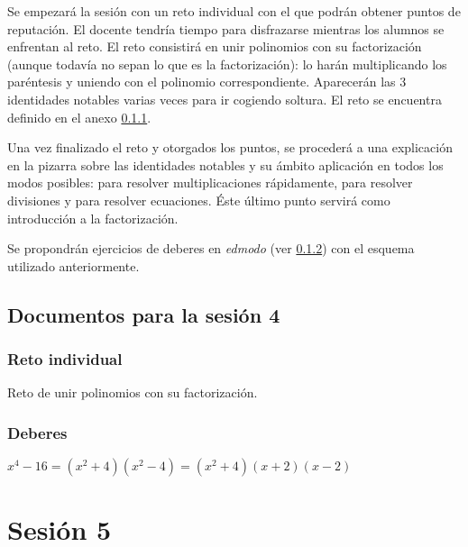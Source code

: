 Se empezará la sesión con un reto individual con el que podrán obtener puntos de reputación.
%
El docente tendría tiempo para disfrazarse mientras los alumnos se enfrentan al reto.
%
El reto consistirá en unir polinomios con su factorización (aunque todavía no sepan lo que es la factorización): lo harán multiplicando los paréntesis y uniendo con el polinomio correspondiente.
%
Aparecerán las 3 identidades notables varias veces para ir cogiendo soltura.
%
El reto se encuentra definido en el anexo \ref{app:ses4:indiv}.

Una vez finalizado el reto y otorgados los puntos, se procederá a una explicación en la pizarra sobre las identidades notables y su ámbito aplicación en todos los modos posibles:
%
para resolver multiplicaciones rápidamente, para resolver divisiones y para resolver ecuaciones.
%
Éste último punto servirá como introducción a la factorización.


Se propondrán ejercicios de deberes en \textit{edmodo} (ver \ref{ses4:deberes}) con el esquema utilizado anteriormente.


\subsection{Documentos para la sesión 4}

\subsubsection{Reto individual}
\label{app:ses4:indiv}

Reto de unir polinomios con su factorización.

\subsubsection{Deberes}
\label{ses4:deberes}

$x^4-16 = (x^2+4)(x^2-4) = (x^2+4)(x+2)(x-2)$



\section{Sesión 5}


